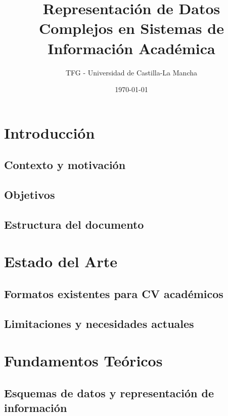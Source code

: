 \documentclass[12pt,a4paper,twoside]{report}
\title{Representación de Datos Complejos en Sistemas de Información Académica}
\author{TFG - Universidad de Castilla-La Mancha}
\date{\today}
\begin{document}
\maketitle

\tableofcontents
\newpage

\chapter{Introducción}
\label{chap:introduccion}

\section{Contexto y motivación}
\label{sec:contexto}


\section{Objetivos}
\label{sec:objetivos}


\section{Estructura del documento}
\label{sec:estructura}


\chapter{Estado del Arte}
\label{chap:estado_del_arte}

\section{Formatos existentes para CV académicos}
\label{sec:formatos_existentes}


\section{Limitaciones y necesidades actuales}
\label{sec:limitaciones}


\chapter{Fundamentos Teóricos}
\label{chap:fundamentos}

\section{Esquemas de datos y representación de información}
\label{sec:esquemas_datos}
\end{document}
